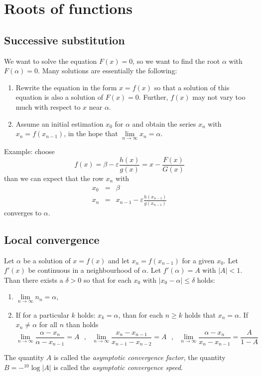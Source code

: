 \documentclass[twoside]{report}
\begin{document}
\section{Roots of functions}
\subsection{Successive substitution}
We want to solve the equation $F(x)=0$, so we want to find the root
$\alpha$ with $F(\alpha)=0$.
\npar
Many solutions are essentially the following:
\begin{enumerate}
\item Rewrite the equation in the form $x=f(x)$ so that a solution of this
      equation is also a solution of $F(x)=0$. Further, $f(x)$ may not vary
      too much with respect to $x$ near $\alpha$.
\item Assume an initial estimation $x_0$ for $\alpha$ and obtain the series
      $x_n$ with $x_n=f(x_{n-1})$, in the hope that $\lim\limits_{n\rightarrow\infty}x_n=\alpha$.
\end{enumerate}
Example: choose
\[
f(x)=\beta-\varepsilon\frac{h(x)}{g(x)}=x-\frac{F(x)}{G(x)}
\]
than we can expect that the row $x_n$ with
\begin{eqnarray*}
x_0&=&\beta\\
x_n&=&x_{n-1}-\varepsilon\frac{h(x_{n-1})}{g(x_{n-1})}
\end{eqnarray*}
converges to $\alpha$.

\subsection{Local convergence}
Let $\alpha$ be a solution of $x=f(x)$ and let $x_n=f(x_{n-1})$ for a given
$x_0$. Let $f'(x)$ be continuous in a neighbourhood of $\alpha$. Let
$f'(\alpha)=A$ with $|A|<1$. Than there exists a $\delta>0$ so that for each
$x_0$ with $|x_0-\alpha|\leq\delta$ holds:
\begin{enumerate}
\item $\lim\limits_{n\rightarrow\infty}n_n=\alpha$,
\item If for a particular $k$ holds: $x_k=\alpha$, than for each $n\geq k$
      holds that $x_n=\alpha$. If $x_n\neq\alpha$ for all $n$ than holds
\[
\lim_{n\rightarrow\infty}\frac{\alpha-x_n}{\alpha-x_{n-1}}=A~~~,~~~
\lim_{n\rightarrow\infty}\frac{x_n-x_{n-1}}{x_{n-1}-x_{n-2}}=A~~~,~~~
\lim_{n\rightarrow\infty}\frac{\alpha-x_n}{x_n-x_{n-1}}=\frac{A}{1-A}
\]
\end{enumerate}
The quantity $A$ is called the {\it asymptotic convergence factor}, the
quantity $B=-{}^{10}\log|A|$ is called the {\it asymptotic convergence speed}.
\end{document}
